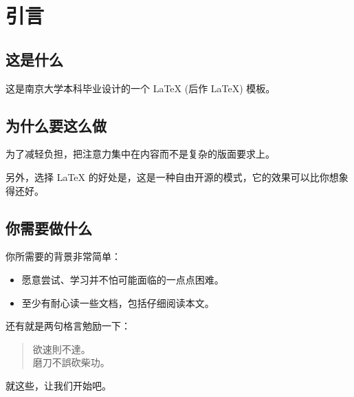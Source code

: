 \chapter{引言}

\section{这是什么}
这是南京大学本科毕业设计的一个 \LaTeX{} (后作 LaTeX) 模板。

\section{为什么要这么做}
为了减轻负担，把注意力集中在内容而不是复杂的版面要求上。

另外，选择 LaTeX 的好处是，这是一种自由开源的模式，它的效果可以比你想象得还好。

\section{你需要做什么}
你所需要的背景非常简单：
\begin{itemize}
	\item 愿意尝试、学习并不怕可能面临的一点点困难。
	\item 至少有耐心读一些文档，包括仔细阅读本文。
\end{itemize}

还有就是两句格言勉励一下：
\begin{verse}
	\kaishu
	欲速則不達。\\
	磨刀不誤砍柴功。
\end{verse}

就这些，让我们开始吧。
